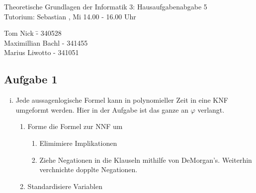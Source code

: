 \documentclass[a4paper,10pt]{article}
\begin{document}
\begin{center}
\Large{Theoretische Grundlagen der Informatik 3: Hausaufgabenabgabe 5} \\
\large{Tutorium: Sebastian , Mi 14.00 - 16.00 Uhr}
\end{center}
\begin{tabbing}
Tom Nick \hspace{2cm}\= - 340528\\
Maximillian Bachl \> - 341455 \\
Marius Liwotto\> -  341051
\end{tabbing}
\subsection*{Aufgabe 1}
\begin{enumerate}[(i)]
\item Jede aussagenlogische Formel kann in polynomieller Zeit in eine KNF umgeformt werden. Hier in der Aufgabe ist das ganze an $\varphi$ verlangt.
	\begin{enumerate}
	\item Forme die Formel zur NNF um
		\begin{enumerate}
			\item Elimimiere Implikationen
			\item Ziehe Negationen in die Klauseln mithilfe von DeMorgan's. Weiterhin verchnichte dopplte Negationen.
		\end{enumerate}
	\item Standardisiere Variablen

	\end{enumerate}
\end{enumerate}
\end{document}
